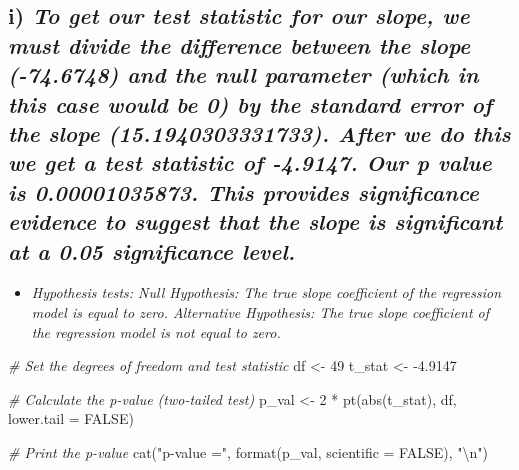 \documentclass[
]{article}
\newenvironment{Shaded}{\begin{snugshade}}{\end{snugshade}}
\newcommand{\AttributeTok}[1]{\textcolor[rgb]{0.77,0.63,0.00}{#1}}
\newcommand{\CommentTok}[1]{\textcolor[rgb]{0.56,0.35,0.01}{\textit{#1}}}
\newcommand{\ConstantTok}[1]{\textcolor[rgb]{0.00,0.00,0.00}{#1}}
\newcommand{\DecValTok}[1]{\textcolor[rgb]{0.00,0.00,0.81}{#1}}
\newcommand{\FloatTok}[1]{\textcolor[rgb]{0.00,0.00,0.81}{#1}}
\newcommand{\FunctionTok}[1]{\textcolor[rgb]{0.00,0.00,0.00}{#1}}
\newcommand{\NormalTok}[1]{#1}
\newcommand{\OtherTok}[1]{\textcolor[rgb]{0.56,0.35,0.01}{#1}}
\newcommand{\SpecialCharTok}[1]{\textcolor[rgb]{0.00,0.00,0.00}{#1}}
\newcommand{\StringTok}[1]{\textcolor[rgb]{0.31,0.60,0.02}{#1}}
\providecommand{\tightlist}{%
  \setlength{\itemsep}{0pt}\setlength{\parskip}{0pt}}
\begin{document}
\hypertarget{i-to-get-our-test-statistic-for-our-slope-we-must-divide-the-difference-between-the-slope--74.6748-and-the-null-parameter-which-in-this-case-would-be-0-by-the-standard-error-of-the-slope-15.1940303331733.-after-we-do-this-we-get-a-test-statistic-of--4.9147.-our-p-value-is-0.00001035873.-this-provides-significance-evidence-to-suggest-that-the-slope-is-significant-at-a-0.05-significance-level.}{%
\subsection{\texorpdfstring{i) \emph{To get our test statistic for our
slope, we must divide the difference between the slope (-74.6748) and
the null parameter (which in this case would be 0) by the standard error
of the slope (15.1940303331733). After we do this we get a test
statistic of -4.9147. Our p value is 0.00001035873. This provides
significance evidence to suggest that the slope is significant at a 0.05
significance
level.}}{i) To get our test statistic for our slope, we must divide the difference between the slope (-74.6748) and the null parameter (which in this case would be 0) by the standard error of the slope (15.1940303331733). After we do this we get a test statistic of -4.9147. Our p value is 0.00001035873. This provides significance evidence to suggest that the slope is significant at a 0.05 significance level.}}\label{i-to-get-our-test-statistic-for-our-slope-we-must-divide-the-difference-between-the-slope--74.6748-and-the-null-parameter-which-in-this-case-would-be-0-by-the-standard-error-of-the-slope-15.1940303331733.-after-we-do-this-we-get-a-test-statistic-of--4.9147.-our-p-value-is-0.00001035873.-this-provides-significance-evidence-to-suggest-that-the-slope-is-significant-at-a-0.05-significance-level.}}

\begin{itemize}
\tightlist
\item
  \emph{Hypothesis tests: Null Hypothesis: The true slope coefficient of
  the regression model is equal to zero. Alternative Hypothesis: The
  true slope coefficient of the regression model is not equal to zero.}
\end{itemize}

\begin{Shaded}
\begin{Highlighting}[]
\CommentTok{\# Set the degrees of freedom and test statistic}
\NormalTok{df }\OtherTok{\textless{}{-}} \DecValTok{49}
\NormalTok{t\_stat }\OtherTok{\textless{}{-}} \SpecialCharTok{{-}}\FloatTok{4.9147}

\CommentTok{\# Calculate the p{-}value (two{-}tailed test)}
\NormalTok{p\_val }\OtherTok{\textless{}{-}} \DecValTok{2} \SpecialCharTok{*} \FunctionTok{pt}\NormalTok{(}\FunctionTok{abs}\NormalTok{(t\_stat), df, }\AttributeTok{lower.tail =} \ConstantTok{FALSE}\NormalTok{)}

\CommentTok{\# Print the p{-}value}
\FunctionTok{cat}\NormalTok{(}\StringTok{"p{-}value ="}\NormalTok{, }\FunctionTok{format}\NormalTok{(p\_val, }\AttributeTok{scientific =} \ConstantTok{FALSE}\NormalTok{), }\StringTok{"}\SpecialCharTok{\textbackslash{}n}\StringTok{"}\NormalTok{)}
\end{Highlighting}
\end{Shaded}
\end{document}
